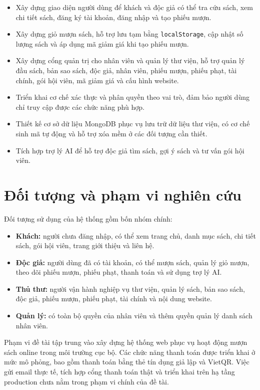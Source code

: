 \documentclass[../main.tex]{subfiles}
\begin{document}
\begin{itemize}
    \item Xây dựng giao diện người dùng để khách và độc giả có thể tra cứu sách, xem chi tiết sách, đăng ký tài khoản, đăng nhập và tạo phiếu mượn.
    \item Xây dựng giỏ mượn sách, hỗ trợ lưu tạm bằng \texttt{localStorage}, cập nhật số lượng sách và áp dụng mã giảm giá khi tạo phiếu mượn.
    \item Xây dựng cổng quản trị cho nhân viên và quản lý thư viện, hỗ trợ quản lý đầu sách, bản sao sách, độc giả, nhân viên, phiếu mượn, phiếu phạt, tài chính, gói hội viên, mã giảm giá và cấu hình website.
    \item Triển khai cơ chế xác thực và phân quyền theo vai trò, đảm bảo người dùng chỉ truy cập được các chức năng phù hợp.
    \item Thiết kế cơ sở dữ liệu MongoDB phục vụ lưu trữ dữ liệu thư viện, có cơ chế sinh mã tự động và hỗ trợ xóa mềm ở các đối tượng cần thiết.
    \item Tích hợp trợ lý AI để hỗ trợ độc giả tìm sách, gợi ý sách và tư vấn gói hội viên.
\end{itemize}

\section{Đối tượng và phạm vi nghiên cứu}

Đối tượng sử dụng của hệ thống gồm bốn nhóm chính:

\begin{itemize}
    \item \textbf{Khách:} người chưa đăng nhập, có thể xem trang chủ, danh mục sách, chi tiết sách, gói hội viên, trang giới thiệu và liên hệ.
    \item \textbf{Độc giả:} người dùng đã có tài khoản, có thể mượn sách, quản lý giỏ mượn, theo dõi phiếu mượn, phiếu phạt, thanh toán và sử dụng trợ lý AI.
    \item \textbf{Thủ thư:} người vận hành nghiệp vụ thư viện, quản lý sách, bản sao sách, độc giả, phiếu mượn, phiếu phạt, tài chính và nội dung website.
    \item \textbf{Quản lý:} có toàn bộ quyền của nhân viên và thêm quyền quản lý danh sách nhân viên.
\end{itemize}

Phạm vi đề tài tập trung vào xây dựng hệ thống web phục vụ hoạt động mượn sách online trong môi trường cục bộ. Các chức năng thanh toán được triển khai ở mức mô phỏng, bao gồm thanh toán bằng thẻ tín dụng giả lập và VietQR. Việc gửi email thực tế, tích hợp cổng thanh toán thật và triển khai trên hạ tầng production chưa nằm trong phạm vi chính của đề tài.
\end{document}

